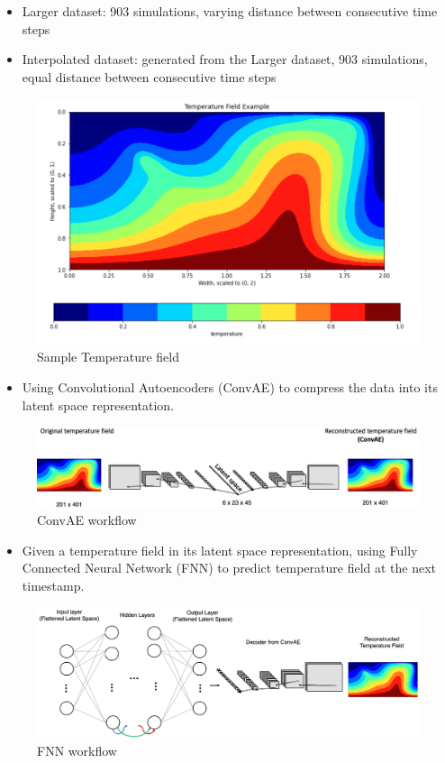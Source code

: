 {\begin{itemize}
\begin{itemize}
	    \item Larger dataset: 903 simulations,           varying distance between consecutive time steps
     
            \item Interpolated dataset: generated from the Larger dataset, 903 simulations, equal distance between consecutive time steps
        \end{itemize}
\end{itemize}

\begin{figure}[H]
    \centering
    \includegraphics[width=0.5\linewidth]{figures/temperature_field_example.png}
    \caption{Sample Temperature field}
\end{figure}   

\begin{itemize}   
    
    \item Using Convolutional Autoencoders (ConvAE) to compress the data into its latent space representation.
\end{itemize}

\begin{figure}[H]
    \centering
    \includegraphics[width=0.8\linewidth]{figures/ConvAE_workflow.png}
    \caption{ConvAE workflow}
\end{figure}

\begin{itemize}  
    \item Given a temperature field in its latent space representation, using Fully Connected Neural Network (FNN) to predict temperature field at the next timestamp. 
\end{itemize}

\begin{figure}[H]
    \centering
    \includegraphics[width=0.8\linewidth]{figures/FNN_workflow.png}
    \caption{FNN workflow}
\end{figure}

}

